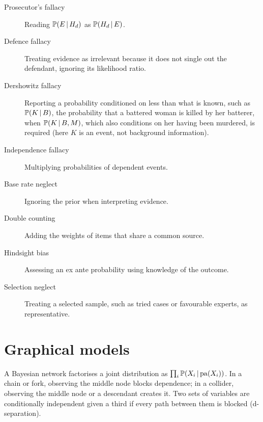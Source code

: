\begin{description}
\item[Prosecutor's fallacy] Reading $\mathbb{P}(E\,\vert\,H_{d})$ as $\mathbb{P}(H_{d}\,\vert\, E)$.
\item[Defence fallacy] Treating evidence as irrelevant because it does not single out the defendant, ignoring its likelihood ratio.
\item[Dershowitz fallacy] Reporting a probability conditioned on less than what is known, such as $\mathbb{P}(K\,\vert\, B)$, the probability that a battered woman is killed by her batterer, when $\mathbb{P}(K\,\vert\, B, M)$, which also conditions on her having been murdered, is required (here $K$ is an event, not background information).
\item[Independence fallacy] Multiplying probabilities of dependent events.
\item[Base rate neglect] Ignoring the prior when interpreting evidence.
\item[Double counting] Adding the weights of items that share a common source.
\item[Hindsight bias] Assessing an ex ante probability using knowledge of the outcome.
\item[Selection neglect] Treating a selected sample, such as tried cases or favourable experts, as representative.
\end{description}

\section{Graphical models}

A Bayesian network factorises a joint distribution as $\prod_i\mathbb{P}(X_i\,\vert\,\mathrm{pa}(X_i))$. In a chain or fork, observing the middle node blocks dependence; in a collider, observing the middle node or a descendant creates it. Two sets of variables are conditionally independent given a third if every path between them is blocked (d-separation).
